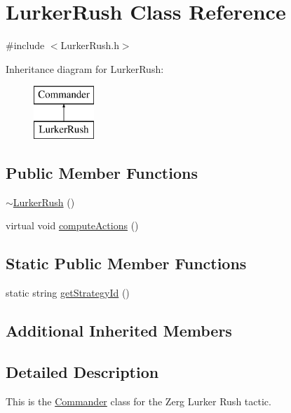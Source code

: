 \hypertarget{class_lurker_rush}{\section{Lurker\-Rush Class Reference}
\label{class_lurker_rush}
}


{\ttfamily \#include $<$Lurker\-Rush.\-h$>$}

Inheritance diagram for Lurker\-Rush\-:\begin{figure}[H]
\begin{center}
\leavevmode
\includegraphics[height=2.000000cm]{class_lurker_rush}
\end{center}
\end{figure}
\subsection*{Public Member Functions}
\begin{DoxyCompactItemize}
\item 
\hyperlink{class_lurker_rush_a97446802b6c9ee9177c5cb2e87fbad06}{$\sim$\-Lurker\-Rush} ()
\item 
virtual void \hyperlink{class_lurker_rush_a46fcdc24bdb39c8ad58338e3c2844655}{compute\-Actions} ()
\end{DoxyCompactItemize}
\subsection*{Static Public Member Functions}
\begin{DoxyCompactItemize}
\item 
static string \hyperlink{class_lurker_rush_a8017f926de2e44f4cad0e9a88b792171}{get\-Strategy\-Id} ()
\end{DoxyCompactItemize}
\subsection*{Additional Inherited Members}


\subsection{Detailed Description}
This is the \hyperlink{class_commander}{Commander} class for the Zerg Lurker Rush tactic.


